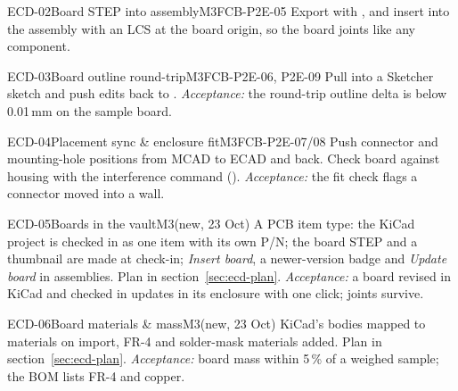 \begin{epic}{ECD-02}{Board STEP into assembly}{M3}{\stProg}{FCB-P2E-05}
Export with , and insert into the assembly with an LCS at the board origin, so
the board joints like any component.
\end{epic}

\begin{epic}{ECD-03}{Board outline round-trip}{M3}{\stTodo}{FCB-P2E-06, P2E-09}
Pull  into a Sketcher sketch and push edits back to .
\emph{Acceptance:} the round-trip outline delta is below 0.01\,mm on the sample board.
\end{epic}

\begin{epic}{ECD-04}{Placement sync \& enclosure fit}{M3}{\stTodo}{FCB-P2E-07/08}
Push connector and mounting-hole positions from MCAD to ECAD and back. Check board against housing with the
interference command ().
\emph{Acceptance:} the fit check flags a connector moved into a wall.
\end{epic}

\begin{epic}{ECD-05}{Boards in the vault}{M3}{\stTodo}{(new, 23 Oct)}
A PCB item type: the KiCad project is checked in as one item with its own P/N; the board STEP and a thumbnail are
made at check-in; \emph{Insert board}, a newer-version badge and \emph{Update board} in assemblies. Plan in
section~\ref{sec:ecd-plan}.
\emph{Acceptance:} a board revised in KiCad and checked in updates in its enclosure with one click; joints survive.
\end{epic}

\begin{epic}{ECD-06}{Board materials \& mass}{M3}{\stProg}{(new, 23 Oct)}
KiCad's bodies mapped to materials on import, FR-4 and solder-mask materials added. Plan in
section~\ref{sec:ecd-plan}.
\emph{Acceptance:} board mass within 5\,\% of a weighed sample; the BOM lists FR-4 and copper.
\end{epic}





